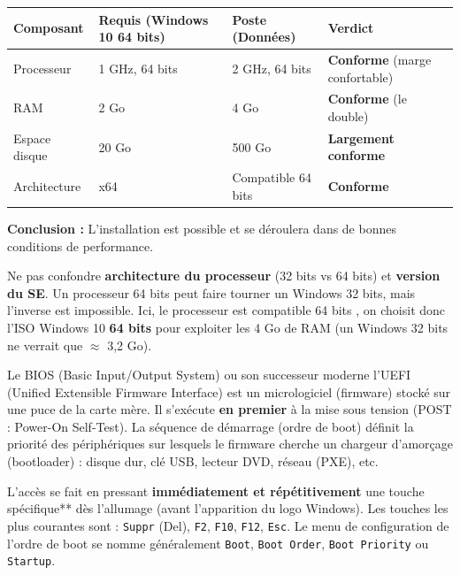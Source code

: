 \documentclass[11pt]{article}
\newcommand{\cle}[1]{{\popxbold\color{popdark}#1}}
\newcounter{popsec}
\newcounter{popsub}
\newcommand{\courssub}[1]{%
  \stepcounter{popsub}%
  \par\vspace{9pt}\noindent{\popxbold\fontsize{11.5}{13}\selectfont\color{popink}{\color{poporange}\thepopsec.\thepopsub}\hspace{6pt}#1}\par\nopagebreak\vspace{4pt}
}
\begin{document}
\begin{exemplebox}
\begin{center}
\begin{tabularx}{\linewidth}{|l|l|l|X|}
\hline
\rowcolor{popblueL} \textbf{Composant} & \textbf{Requis (Windows 10 64 bits)} & \textbf{Poste (Données)} & \textbf{Verdict} \\
\hline
Processeur & 1 GHz, 64 bits & 2 GHz, 64 bits & \textbf{Conforme} (marge confortable) \\
\hline
RAM & 2 Go & 4 Go & \textbf{Conforme} (le double) \\
\hline
Espace disque & 20 Go & 500 Go & \textbf{Largement conforme} \\
\hline
Architecture & x64 & Compatible 64 bits & \textbf{Conforme} \\
\hline
\end{tabularx}
\end{center}
\textbf{Conclusion :} L'installation est possible et se déroulera dans de bonnes conditions de performance.
\end{exemplebox}

\begin{attention}
Ne pas confondre \textbf{architecture du processeur} (32 bits vs 64 bits) et \textbf{version du SE}. Un processeur 64 bits peut faire tourner un Windows 32 bits, mais l'inverse est impossible. Ici, le processeur est \og compatible 64 bits \fg{}, on choisit donc l'ISO Windows 10 \textbf{64 bits} pour exploiter les 4 Go de RAM (un Windows 32 bits ne verrait que $\approx$ 3,2 Go).
\end{attention}

\courssub{BIOS et séquence de démarrage}

\begin{definition}
Le \cle{BIOS} (Basic Input/Output System) ou son successeur moderne l'\cle{UEFI} (Unified Extensible Firmware Interface) est un micrologiciel (firmware) stocké sur une puce de la carte mère. Il s'exécute \textbf{en premier} à la mise sous tension (POST : Power-On Self-Test). La \cle{séquence de démarrage} (ordre de boot) définit la priorité des périphériques sur lesquels le firmware cherche un chargeur d'amorçage (bootloader) : disque dur, clé USB, lecteur DVD, réseau (PXE), etc.
\end{definition}

\begin{propriete}
L'accès se fait en pressant \textbf{immédiatement et répétitivement} une touche spécifique** dès l'allumage (avant l'apparition du logo Windows). Les touches les plus courantes sont : \texttt{Suppr} (Del), \texttt{F2}, \texttt{F10}, \texttt{F12}, \texttt{Esc}. Le menu de configuration de l'ordre de boot se nomme généralement \texttt{Boot}, \texttt{Boot Order}, \texttt{Boot Priority} ou \texttt{Startup}.
\end{propriete}
\end{document}
